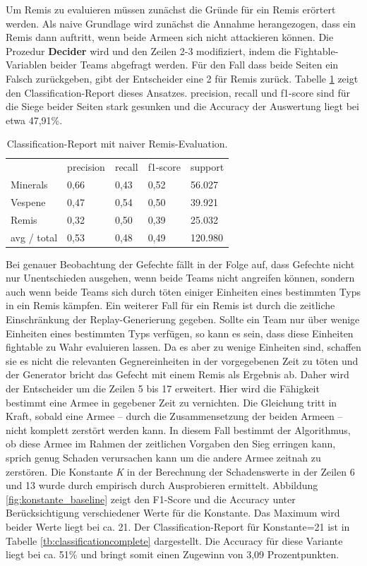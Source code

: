 Um Remis zu evaluieren müssen zunächst die Gründe für ein Remis erörtert werden. Als naive Grundlage wird zunächst die Annahme herangezogen, dass ein Remis dann auftritt, wenn beide Armeen sich nicht attackieren können. Die Prozedur \textbf{Decider} wird und den Zeilen 2-3 modifiziert, indem die Fightable-Variablen beider Teams abgefragt werden. Für den Fall dass beide Seiten ein Falsch zurückgeben, gibt der Entscheider eine 2 für Remis zurück. Tabelle \ref{tb:classificationmitremisnaiv} zeigt den Classification-Report dieses Ansatzes.  precision, recall und f1-score sind für die Siege beider Seiten stark gesunken und die Accuracy der Auswertung liegt bei etwa 47,91\%.  

\begin{table}
\centering
\caption{Classification-Report mit naiver Remis-Evaluation.}
\begin{tabular}{@{}lllll@{}}
\hline
& precision & recall & f1-score & support\\
Minerals & 0,66 & 0,43 & 0,52 & 56.027\\
Vespene & 0,47 & 0,54 & 0,50 & 39.921\\
Remis & 0,32 & 0,50 & 0,39 & 25.032\\
 avg / total & 0,53 & 0,48 & 0,49 & 120.980\\
\hline
\end{tabular}
\label{tb:classificationmitremisnaiv}
\end{table}

Bei genauer Beobachtung der Gefechte fällt in der Folge auf, dass Gefechte nicht nur Unentschieden ausgehen, wenn beide Teams nicht angreifen können, sondern auch wenn beide Teams sich durch töten einiger Einheiten eines bestimmten Typs in ein Remis kämpfen. Ein weiterer Fall für ein Remis ist durch die zeitliche Einschränkung der Replay-Generierung gegeben. Sollte ein Team nur über wenige Einheiten eines bestimmten Typs verfügen, so kann es sein, dass diese Einheiten fightable zu Wahr evaluieren lassen. Da es aber zu wenige Einheiten sind, schaffen sie es nicht die relevanten Gegnereinheiten in der vorgegebenen Zeit zu töten und der Generator bricht das Gefecht mit einem Remis als Ergebnis ab. Daher wird der Entscheider um die Zeilen 5 bis 17 erweitert. Hier wird die Fähigkeit bestimmt eine Armee in gegebener Zeit zu vernichten. Die Gleichung tritt in Kraft, sobald eine Armee -- durch die Zusammensetzung der beiden Armeen -- nicht komplett zerstört werden kann. In diesem Fall bestimmt der Algorithmus, ob diese Armee im Rahmen der zeitlichen Vorgaben den Sieg erringen kann, sprich genug Schaden verursachen kann um die andere Armee zeitnah zu zerstören. Die Konstante \textit{K} in der Berechnung der Schadenswerte in der Zeilen 6 und 13 wurde durch empirisch durch Ausprobieren ermittelt. Abbildung \ref{fig:konstante_baseline} zeigt den F1-Score und die Accuracy unter Berücksichtigung verschiedener Werte für die Konstante. Das Maximum wird beider Werte liegt bei ca. 21. Der Classification-Report für Konstante=21 ist in Tabelle \ref{tb:classificationcomplete} dargestellt. Die Accuracy für diese Variante liegt bei ca. 51\% und bringt somit einen Zugewinn von 3,09 Prozentpunkten.

